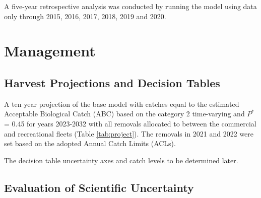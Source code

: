 \documentclass[11pt,
  english,
  a4paper,
]{article}
\begin{document}

A five-year retrospective analysis was conducted by running the model using data only through 2015, 2016, 2017, 2018, 2019 and 2020.

\leavevmode\tagmcend\tagstructend\par


\hypertarget{management}{%
\section{Management}\label{management}}

\leavevmode\tagmcend\tagstructend


\hypertarget{harvest-projections-and-decision-tables}{%
\subsection{Harvest Projections and Decision Tables}\label{harvest-projections-and-decision-tables}}

\leavevmode\tagmcend\tagstructend


A ten year projection of the base model with catches equal to the estimated Acceptable Biological Catch (ABC) based on the category 2 time-varying and {\(P^*\)\leavevmode\tagmcend\tagstructend} = 0.45 for years 2023-2032 with all removals allocated to between the commercial and recreational fleets (Table \ref{tab:project}). The removals in 2021 and 2022 were set based on the adopted Annual Catch Limits (ACLs).

\leavevmode\tagmcend\tagstructend\par


The decision table uncertainty axes and catch levels to be determined later.

\leavevmode\tagmcend\tagstructend\par


\hypertarget{evaluation-of-scientific-uncertainty}{%
\subsection{Evaluation of Scientific Uncertainty}\label{evaluation-of-scientific-uncertainty}}
\end{document}
